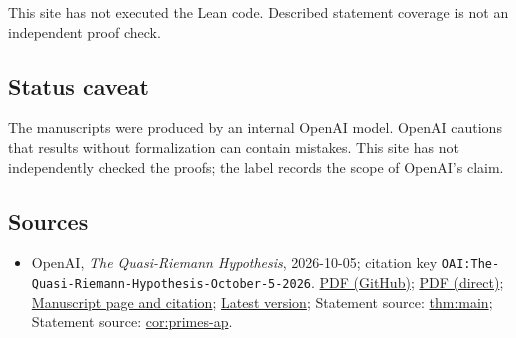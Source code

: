 \documentclass[11pt]{article}
\begin{document}
This site has not executed the Lean code. Described statement coverage is not an independent proof check.

\subsection{Status caveat}
The manuscripts were produced by an internal OpenAI model. OpenAI cautions that results without formalization can contain mistakes. This site has not independently checked the proofs; the label records the scope of OpenAI's claim.

\subsection{Sources}
\begin{itemize}
\item OpenAI, \emph{The Quasi-Riemann Hypothesis}, 2026-10-05; citation key \texttt{OAI:The-Quasi-Riemann-Hypothesis-October-5-2026}. \href{https://github.com/openai/math/blob/adc7f1241b42e322a6451854ab7e4b4c146bf78a/preprints/The-Quasi-Riemann-Hypothesis-October-5-2026/paper2.pdf}{PDF (GitHub)}; \href{https://github.com/openai/math/raw/adc7f1241b42e322a6451854ab7e4b4c146bf78a/preprints/The-Quasi-Riemann-Hypothesis-October-5-2026/paper2.pdf}{PDF (direct)}; \href{https://github.com/openai/math/blob/adc7f1241b42e322a6451854ab7e4b4c146bf78a/preprints/The-Quasi-Riemann-Hypothesis-October-5-2026/README.md}{Manuscript page and citation}; \href{https://github.com/openai/math/blob/main/preprints/The-Quasi-Riemann-Hypothesis-October-5-2026/paper2.pdf}{Latest version}; Statement source: \href{https://github.com/openai/math/blob/adc7f1241b42e322a6451854ab7e4b4c146bf78a/preprints/The-Quasi-Riemann-Hypothesis-October-5-2026/build/paper2.tex\#L73}{thm:main}; Statement source: \href{https://github.com/openai/math/blob/adc7f1241b42e322a6451854ab7e4b4c146bf78a/preprints/The-Quasi-Riemann-Hypothesis-October-5-2026/build/paper2.tex\#L84}{cor:primes-ap}.

\end{itemize}
\end{document}
